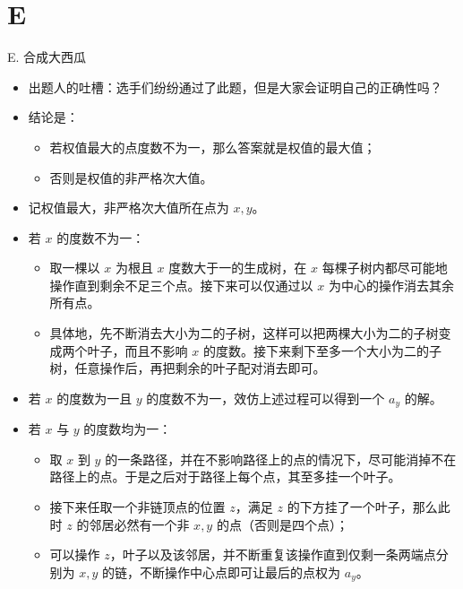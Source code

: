 \documentclass[9pt]{ctexbeamer}
\newcommand{\setParDis}{\setlength{\parskip}{6pt}}
\begin{document}
\section{E}

\begin{frame}
\setParDis

E. 合成大西瓜

\begin{itemize}
	\item 出题人的吐槽：选手们纷纷通过了此题，但是大家会证明自己的正确性吗？
	\item 结论是：
		\begin{itemize}
			\item 若权值最大的点度数不为一，那么答案就是权值的最大值；
			\item 否则是权值的非严格次大值。
		\end{itemize}
\end{itemize}

\end{frame}


\begin{frame}
\setParDis

\begin{itemize}
	\item 记权值最大，非严格次大值所在点为 $x,y$。
	\item 若 $x$ 的度数不为一：
		\begin{itemize}
			\item 取一棵以 $x$ 为根且 $x$ 度数大于一的生成树，在 $x$ 每棵子树内都尽可能地操作直到剩余不足三个点。接下来可以仅通过以 $x$ 为中心的操作消去其余所有点。
			\item 具体地，先不断消去大小为二的子树，这样可以把两棵大小为二的子树变成两个叶子，而且不影响 $x$ 的度数。接下来剩下至多一个大小为二的子树，任意操作后，再把剩余的叶子配对消去即可。
		\end{itemize}
	\item 若 $x$ 的度数为一且 $y$ 的度数不为一，效仿上述过程可以得到一个 $a_y$ 的解。
	\item 若 $x$ 与 $y$ 的度数均为一：
		\begin{itemize}
			\item 取 $x$ 到 $y$ 的一条路径，并在不影响路径上的点的情况下，尽可能消掉不在路径上的点。于是之后对于路径上每个点，其至多挂一个叶子。
			\item 接下来任取一个非链顶点的位置 $z$，满足 $z$ 的下方挂了一个叶子，那么此时 $z$ 的邻居必然有一个非 $x,y$ 的点（否则是四个点）；
			\item 可以操作 $z$，叶子以及该邻居，并不断重复该操作直到仅剩一条两端点分别为 $x,y$ 的链，不断操作中心点即可让最后的点权为 $a_y$。
		\end{itemize}
\end{itemize}
\end{frame}
\end{document}
